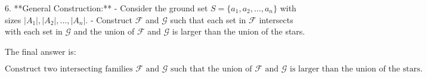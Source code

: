 6. **General Construction:**
   - Consider the ground set \( S = \{a_1, a_2, \ldots, a_n\} \) with sizes \( |A_1|, |A_2|, \ldots, |A_n| \).
   - Construct \( \mathcal{F} \) and \( \mathcal{G} \) such that each set in \( \mathcal{F} \) intersects with each set in \( \mathcal{G} \) and the union of \( \mathcal{F} \) and \( \mathcal{G} \) is larger than the union of the stars.

The final answer is:

\[
\boxed{\text{Construct two intersecting families } \mathcal{F} \text{ and } \mathcal{G} \text{ such that the union of } \mathcal{F} \text{ and } \mathcal{G} \text{ is larger than the union of the stars.}}
\]